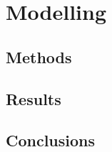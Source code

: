 \chapter{Modelling}\label{ch:mod} %
\lipsum[1-4]
\section{Methods}
\lipsum[1-4]
\section{Results}
\lipsum[1-4]
\section{Conclusions}
\lipsum[1-4]

